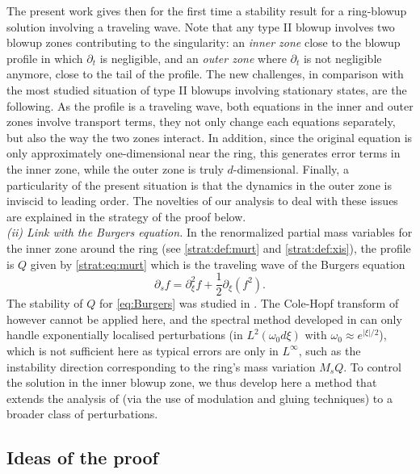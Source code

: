 \documentclass[11pt]{aims}
\theoremstyle{definition}
\newcommand{\pa}{\partial}
\numberwithin{equation}{section}
\begin{document}
The present work gives then for the first time a stability result for a ring-blowup solution involving a traveling wave. Note that any type II blowup involves two blowup zones contributing to the singularity: an \emph{inner zone} close to the blowup profile in which $\pa_t$ is negligible, and an \emph{outer zone} where $\pa_t$ is not negligible anymore, close to the tail of the profile. The new challenges, in comparison with the most studied situation of type II blowups involving stationary states, are the following. As the profile is a traveling wave, both equations in the inner and outer zones involve transport terms, they not only change each equations separately, but also the way the two zones interact. In addition, since the original equation is only approximately one-dimensional near the ring, this generates error terms in the inner zone, while the outer zone is truly $d$-dimensional. Finally, a particularity of the present situation is that the dynamics in the outer zone is  inviscid to leading order. The novelties of our analysis to deal with these issues are explained in the strategy of the proof below. \\

\noindent \emph{(ii) Link with the Burgers equation.} In the renormalized partial mass variables for the inner zone around the ring (see \eqref{strat:def:murt} and \eqref{strat:def:xis}), the profile is $Q$ given by \eqref{strat:eq:murt} which is the traveling wave of the Burgers equation
\begin{equation} \label{eq:Burgers}
\pa_s f = \pa_\xi^2 f + \frac{1}{2}\pa_\xi(f^2).
\end{equation}
The stability of $Q$ for \eqref{eq:Burgers} was studied in \cite{IlOl,Sam76,Njjam85,KM}. The Cole-Hopf transform of \cite{Njjam85} however cannot be applied here, and the spectral method developed in \cite{Sam76} can only handle exponentially localised perturbations (in $L^2(\omega_0d\xi)$ with $\omega_0 \approx e^{|\xi|/2}$), which is not sufficient here as typical errors are only in $L^\infty$, such as the instability direction corresponding to the ring's mass variation $M_s Q$. To control the solution in the inner blowup zone, we thus develop here a method that extends the analysis of \cite{Sam76} (via the use of modulation and gluing techniques) to a broader class of perturbations.



\subsection{Ideas of the proof}
\end{document}
